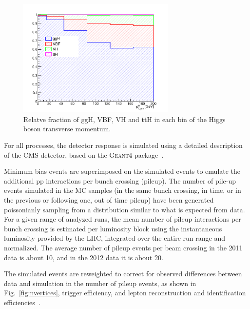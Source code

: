 \begin{figure}[htb]
\centering
\includegraphics[width=0.7\textwidth]{images/signal_composition_ttH.pdf}
\caption{Relatve fraction of ggH, VBF, VH and ttH in each bin of the Higgs boson transverse momentum.}\label{fig:signal_comp}
\end{figure}


For all processes, the detector response is simulated using a detailed description of the CMS detector, based on the \textsc{Geant4} package~\cite{Agostinelli:2002hh}.

Minimum bias events are superimposed on the simulated events to emulate the additional 
pp interactions per bunch crossing (pileup). The number of pile-up events simulated in the MC samples
(in the same bunch crossing, in time, or in the previous or following one, out of time pileup)
have been generated poissonianly sampling from a distribution similar to what
is expected from data. For a given range of analyzed runs, the mean number of pileup interactions per bunch crossing is estimated per luminosity block using the instantaneous luminosity provided by the LHC, integrated over the entire run range and normalized.
The average number of pileup events per beam crossing in the 2011 data is about 10, and in the 2012 data it is about 20.

The simulated events are reweighted to correct for observed differences between data and simulation in the number of pileup events, as shown in Fig.~\ref{fig:nvertices}, trigger efficiency, and lepton reconstruction and identification efficiencies~\cite{Chatrchyan:2013iaa}.

